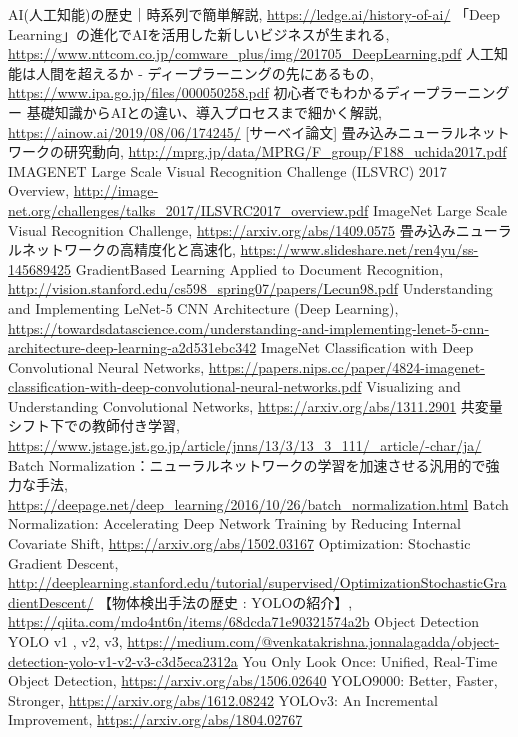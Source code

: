 \begin{thebibliography}{9}
	 AI(人工知能)の歴史｜時系列で簡単解説, \url{https://ledge.ai/history-of-ai/}
	 「Deep Learning」の進化でAIを活用した新しいビジネスが生まれる, \url{https://www.nttcom.co.jp/comware_plus/img/201705_DeepLearning.pdf}
	 人工知能は人間を超えるか - ディープラーニングの先にあるもの, \url{https://www.ipa.go.jp/files/000050258.pdf}
	 初心者でもわかるディープラーニング ー 基礎知識からAIとの違い、導入プロセスまで細かく解説, \url{https://ainow.ai/2019/08/06/174245/}
	 [サーベイ論文] 畳み込みニューラルネットワークの研究動向, \url{http://mprg.jp/data/MPRG/F_group/F188_uchida2017.pdf}
	 IMAGENET Large Scale Visual Recognition Challenge (ILSVRC) 2017 Overview, \url{http://image-net.org/challenges/talks_2017/ILSVRC2017_overview.pdf}
	 ImageNet Large Scale Visual Recognition Challenge, \url{https://arxiv.org/abs/1409.0575}
	 畳み込みニューラルネットワークの高精度化と高速化, \url{https://www.slideshare.net/ren4yu/ss-145689425}
	 GradientBased Learning Applied to Document Recognition, \url{http://vision.stanford.edu/cs598_spring07/papers/Lecun98.pdf}
	 Understanding and Implementing LeNet-5 CNN Architecture (Deep Learning), \url{https://towardsdatascience.com/understanding-and-implementing-lenet-5-cnn-architecture-deep-learning-a2d531ebc342}
	 ImageNet Classification with Deep Convolutional Neural Networks, \url{https://papers.nips.cc/paper/4824-imagenet-classification-with-deep-convolutional-neural-networks.pdf}
	 Visualizing and Understanding Convolutional Networks, \url{https://arxiv.org/abs/1311.2901}
	 共変量シフト下での教師付き学習, \url{https://www.jstage.jst.go.jp/article/jnns/13/3/13_3_111/_article/-char/ja/}
	 Batch Normalization：ニューラルネットワークの学習を加速させる汎用的で強力な手法, \url{https://deepage.net/deep_learning/2016/10/26/batch_normalization.html}
	 Batch Normalization: Accelerating Deep Network Training by Reducing Internal Covariate Shift, \url{https://arxiv.org/abs/1502.03167}
	 Optimization: Stochastic Gradient Descent, \url{http://deeplearning.stanford.edu/tutorial/supervised/OptimizationStochasticGradientDescent/}
	 【物体検出手法の歴史 : YOLOの紹介】, \url{https://qiita.com/mdo4nt6n/items/68dcda71e90321574a2b}
	 Object Detection YOLO v1 , v2, v3, \url{https://medium.com/@venkatakrishna.jonnalagadda/object-detection-yolo-v1-v2-v3-c3d5eca2312a}
	 You Only Look Once: Unified, Real-Time Object Detection, \url{https://arxiv.org/abs/1506.02640}
	 YOLO9000: Better, Faster, Stronger, \url{https://arxiv.org/abs/1612.08242}
	 YOLOv3: An Incremental Improvement, \url{https://arxiv.org/abs/1804.02767}
\end{thebibliography}
